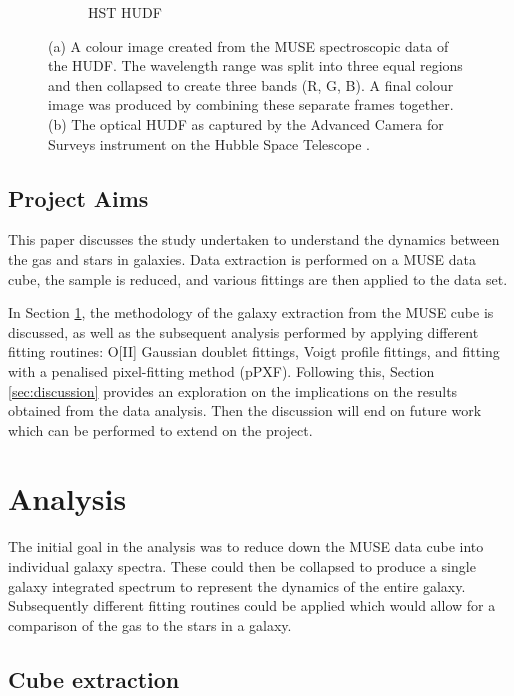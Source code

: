 \documentclass[12pt, twocolumn]{revtex4}    %
\begin{document}
\begin{figure}
\begin{subfigure}[b]{0.4\textwidth}
    \captionsetup{justification=justified}    
    \caption{HST HUDF}
    \label{fig:hubble_ultra_deep_field}
  \end{subfigure}
  \captionsetup{justification=justified}
  \caption[Hubble Ultra Deep Field]{(a) A colour image created from the MUSE spectroscopic data of the HUDF. The wavelength range was split into three equal regions and then collapsed to create three bands (R, G, B). A final colour image was produced by combining these separate frames together. (b) The optical HUDF as captured by the Advanced Camera for Surveys instrument on the Hubble Space Telescope \cite{hudf_image}. }
  \label{fig:hst_muse_hdf}
\end{figure}

\subsection{Project Aims}
This paper discusses the study undertaken to understand the dynamics between the gas and stars in galaxies. Data extraction is performed on a MUSE data cube, the sample is reduced, and various fittings are then applied to the data set. 

In Section \ref{sec:analysis}, the methodology of the galaxy extraction from the MUSE cube is discussed, as well as the subsequent analysis performed by applying different fitting routines: O[II] Gaussian doublet fittings, Voigt profile fittings, and fitting with a penalised pixel-fitting method (pPXF). Following this, Section \ref{sec:discussion} provides an exploration on the implications on the results obtained from the data analysis. Then the discussion will end on future work which can be performed to extend on the project.

\section{Analysis} 
\label{sec:analysis}

The initial goal in the analysis was to reduce down the MUSE data cube into individual galaxy spectra. These could then be collapsed to produce a single galaxy integrated spectrum to represent the dynamics of the entire galaxy. Subsequently different fitting routines could be applied which would allow for a comparison of the gas to the stars in a galaxy.

\subsection{Cube extraction}
\end{document}
